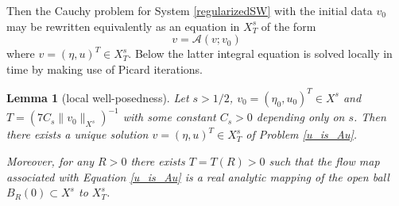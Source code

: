 \documentclass[reqno,12pt,a4paper]{article}
\theoremstyle{plain}
\newtheorem{lemma}[theorem]{\bf Lemma}
\begin{document}
%
Then the Cauchy problem for System \eqref{regularizedSW}
with the initial data $v_0$ may be rewritten
equivalently
as an equation in $X^s_T$ of the form
%
\begin{equation}
\label{u_is_Au}
	 v = \mathcal A(v; v_0)
\end{equation}
%
where $v = (\eta, u)^T \in X^s_T$.
Below the latter integral equation is solved locally in time
by making use of Picard iterations.
%
%
\begin{lemma}[local well-posedness]
\label{local_well_posedness_lemma}
	Let $s > 1/2$, $v_0 = (\eta_0, u_0)^T \in X^s$
	and $T = ( 7C_s \lVert v_0 \rVert_{X^s} )^{-1}$
	with some constant $C_s > 0$ depending only on $s$.
	Then there exists a unique solution
	$v = (\eta, u)^T \in X^s_T$ of Problem \eqref{u_is_Au}.


	Moreover, for any $R > 0$ there exists $T = T(R) > 0$
	such that the flow map associated with Equation \eqref{u_is_Au}
	is a real analytic mapping of the open ball
	$B_R(0) \subset X^s$ to $X^s_T$.
\end{lemma}
%
\end{document}
